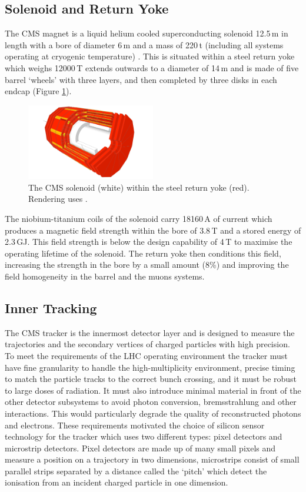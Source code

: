 \subsection{Solenoid and Return Yoke}

The CMS magnet is a liquid helium cooled superconducting solenoid 12.5\,m in length with a bore of diameter 6\,m and a mass of 220\,t (including all systems operating at cryogenic temperature) \cite{CMSPhysics}. 
This is situated within a steel return yoke \cite{Yoke} which weighs 12000\,T extends outwards to a diameter of 14\,m and is made of five barrel `wheels' with three layers, and then completed by three disks in each endcap (Figure \ref{fig:apparatus:solenoid_yoke}).
\begin{figure}[h!]
    \includegraphics[width=0.5\textwidth]{figures/apparatus/solenoid_yoke.pdf}
    \caption{The CMS solenoid (white) within the steel return yoke (red). Rendering uses \cite{SketchupCMS}.}
    \label{fig:apparatus:solenoid_yoke}
\end{figure}
The niobium-titanium coils of the solenoid carry 18160\,A of current which produces a magnetic field strength within the bore of 3.8\,T and a stored energy of 2.3\,GJ. 
This field strength is below the design capability of 4\,T to maximise the operating lifetime of the solenoid.
The return yoke then conditions this field, increasing the strength in the bore by a small amount (8\%) \cite{Yoke} and improving the field homogeneity in the barrel and the muons systems. 


\subsection{Inner Tracking}

The CMS tracker \cite{CMSTrackerTDR} is the innermost detector layer and is designed to measure the trajectories and the secondary vertices of charged particles with high precision. 
To meet the requirements of the LHC operating environment the tracker must have fine granularity to handle the high-multiplicity environment, precise timing to match the particle tracks to the correct bunch crossing, and it must be robust to large doses of radiation.
It must also introduce minimal material in front of the other detector subsystems to avoid photon conversion, bremsstrahlung and other interactions. This would particularly degrade the quality of reconstructed photons and electrons. 
These requirements motivated the choice of silicon sensor technology for the tracker which uses two different types: pixel detectors and microstrip detectors. Pixel detectors are made up of many small pixels and measure a position on a trajectory in two dimensions, microstrips consist of small parallel strips separated by a distance called the `pitch' which detect the ionisation from an incident charged particle in one dimension. 


